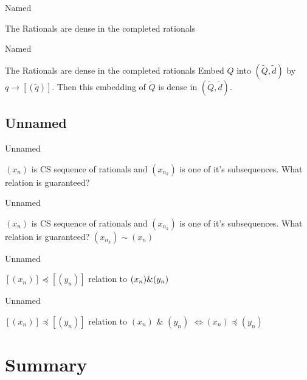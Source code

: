 \documentclass{beamer}
\begin{document}
\begin{frame}{Named}
	\begin{block}{The Rationals are dense in the completed rationals}
	\end{block}
\end{frame}

\begin{frame}{Named}
        \begin{block}{The Rationals are dense in the completed rationals}
        	Embed $Q$ into $(\tilde{Q},\tilde{d})$ by $q \rightarrow [(\tilde{q})]$. Then this embedding of $\tilde{Q}$ is dense in $(\tilde{Q},\tilde{d})$.
	\end{block}
\end{frame}

\subsection{Unnamed}

\begin{frame}{Unnamed}
	\begin{block}{$(x_n)$ is CS sequence of rationals and $(x_{n_k})$ is one of it's subsequences. What relation is guaranteed?}
	\end{block}
\end{frame}

\begin{frame}{Unnamed}
	\begin{block}{$(x_n)$ is CS sequence of rationals and $(x_{n_k})$ is one of it's subsequences. What relation is guaranteed?}
		$(x_{n_k}) \sim (x_n)$
        \end{block}
\end{frame}

\begin{frame}{Unnamed}
	\begin{block}{$[(x_n)] \preceq [(y_n)]$ relation to $(x_n) \space \& \space (y_n)$}
	\end{block}
\end{frame}

\begin{frame}{Unnamed}
	\begin{block}{$[(x_n)] \preceq [(y_n)]$ relation to $(x_n)$ $\&$ $(y_n)$}
		$\iff (x_n) \preceq (y_n)$
	\end{block}
\end{frame}



\section*{Summary}
\end{document}
